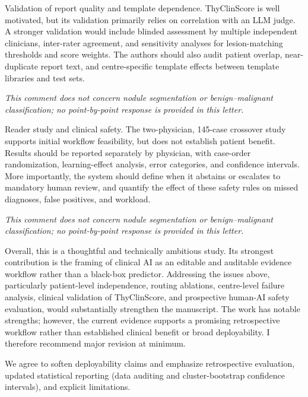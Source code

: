 \begin{reviewercomment}
Validation of report quality and template dependence. ThyClinScore is well motivated, but its validation primarily relies on correlation with an LLM judge. A stronger validation would include blinded assessment by multiple independent clinicians, inter-rater agreement, and sensitivity analyses for lesion-matching thresholds and score weights. The authors should also audit patient overlap, near-duplicate report text, and centre-specific template effects between template libraries and test sets.
\end{reviewercomment}
\begin{authorresponse}
\noindent\textit{This comment does not concern nodule segmentation or benign--malignant classification; no point-by-point response is provided in this letter.}
\end{authorresponse}

\begin{reviewercomment}
Reader study and clinical safety. The two-physician, 145-case crossover study supports initial workflow feasibility, but does not establish patient benefit. Results should be reported separately by physician, with case-order randomization, learning-effect analysis, error categories, and confidence intervals. More importantly, the system should define when it abstains or escalates to mandatory human review, and quantify the effect of these safety rules on missed diagnoses, false positives, and workload.
\end{reviewercomment}
\begin{authorresponse}
\noindent\textit{This comment does not concern nodule segmentation or benign--malignant classification; no point-by-point response is provided in this letter.}
\end{authorresponse}

\begin{reviewercomment}
Overall, this is a thoughtful and technically ambitious study. Its strongest contribution is the framing of clinical AI as an editable and auditable evidence workflow rather than a black-box predictor. Addressing the issues above, particularly patient-level independence, routing ablations, centre-level failure analysis, clinical validation of ThyClinScore, and prospective human-AI safety evaluation, would substantially strengthen the manuscript. The work has notable strengths; however, the current evidence supports a promising retrospective workflow rather than established clinical benefit or broad deployability. I therefore recommend major revision at minimum.
\end{reviewercomment}
\begin{authorresponse}
We agree to soften deployability claims and emphasize retrospective evaluation, updated statistical reporting (data auditing and cluster-bootstrap confidence intervals), and explicit limitations.\par
\end{authorresponse}

